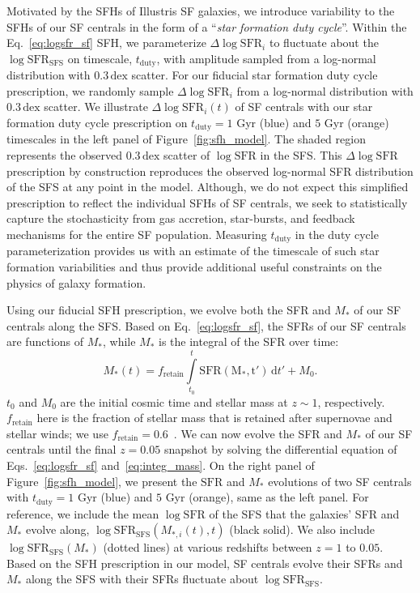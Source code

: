 \documentclass[12pt, letterpaper, preprint, tighten]{aastex62}
\newcommand{\edt}[1]{{\color{dred}{\bf} #1}}
\newcommand{\beq}{\begin{equation}}
\newcommand{\eeq}{\end{equation}}
\newcommand{\logsfr}{\log\mathrm{SFR}}
\newcommand{\logsfrsfs}{\log\mathrm{SFR}_\mathrm{SFS}}
\begin{document}
Motivated by the SFHs of Illustris SF galaxies, we introduce variability 
to the SFHs of our SF centrals in the form of a ``\emph{star formation duty cycle}''. 
Within the Eq.~\ref{eq:logsfr_sf} SFH, we parameterize $\Delta \logsfr_i$ to 
fluctuate about the $\logsfrsfs$ on timescale, $t_\mathrm{duty}$, with 
amplitude sampled from a log-normal distribution with $0.3\,\mathrm{dex}$ 
scatter. For our fiducial star formation duty cycle prescription, we randomly 
sample $\Delta \logsfr_i$ from a log-normal distribution with 
\edt{$0.3\,\mathrm{dex}$ scatter}. 
We illustrate $\Delta \logsfr_i(t)$ of SF centrals with our star formation 
duty cycle prescription on $t_\mathrm{duty}=1$ Gyr (blue) and $5$ Gyr (orange) 
timescales in the left panel of Figure~\ref{fig:sfh_model}. 
The shaded region represents the observed $0.3\,\mathrm{dex}$ scatter of 
$\logsfr$ in the SFS. This $\Delta \logsfr$ prescription by construction 
reproduces the observed log-normal SFR distribution of the SFS 
at any point in the model. Although, we do not expect this simplified 
prescription to reflect the individual SFHs of SF centrals, 
we seek to statistically capture the stochasticity from gas accretion, 
star-bursts, and feedback mechanisms for the entire SF population. 
Measuring $t_\mathrm{duty}$ in the duty cycle parameterization
provides us with an estimate of the timescale of such star formation 
variabilities and thus provide additional useful constraints on the 
physics of galaxy formation. 

Using our fiducial SFH prescription, we evolve both the SFR and $M_*$ 
of our SF centrals along the SFS. Based on Eq.~\ref{eq:logsfr_sf},
the SFRs of our SF centrals are functions of $M_*$, while $M_*$ 
is the integral of the SFR over time: 
\beq \label{eq:integ_mass} 
M_*(t) = f_\mathrm{retain} \int\limits_{t_0}^{t} \mathrm{SFR(M_*, t')}\,\mathrm{d}t' + M_0. 
\eeq
$t_0$ and $M_0$ are the initial cosmic time and stellar mass at $z \sim 1$, 
respectively. $f_\mathrm{retain}$ here is the fraction of stellar mass 
that is retained after supernovae and stellar winds; we use 
$f_\mathrm{retain} = 0.6$~\citep{wetzel2013}. We can now evolve the SFR and 
$M_*$ of our SF centrals until the final $z=0.05$ snapshot by 
solving the differential equation of Eqs.~\ref{eq:logsfr_sf} and~\ref{eq:integ_mass}. 
On the right panel of Figure~\ref{fig:sfh_model}, we present the 
$\mathrm{SFR}$ and $M_*$ evolutions of two SF centrals with 
$t_\mathrm{duty}=1$ Gyr (blue) and $5$ Gyr (orange), same 
as the left panel. For reference, we include the mean $\logsfr$ of the SFS 
that the galaxies' SFR and $M_*$ evolve along, $\logsfrsfs(M_{*,i}(t), t)$ 
(black solid). We also include $\logsfrsfs(M_*)$ (dotted lines) at various 
redshifts between $z = 1$ to $0.05$. Based on the SFH prescription in our 
model, SF centrals evolve their SFRs and $M_*$ along the SFS 
with their SFRs fluctuate about $\logsfrsfs$.
\end{document}
